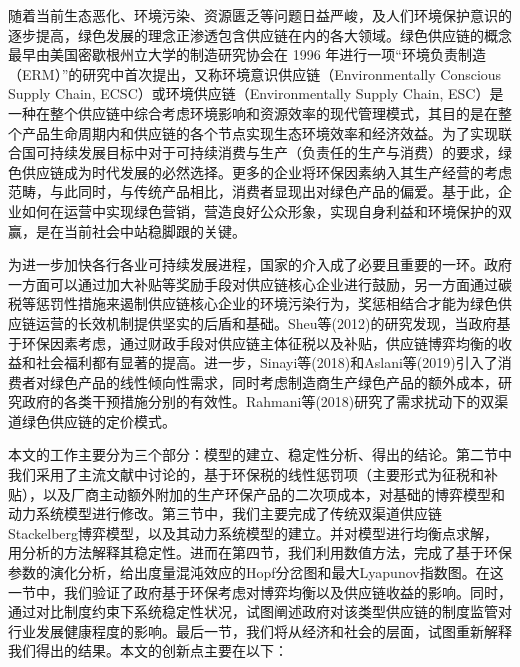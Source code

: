 \documentclass{article}
\begin{document}
\par 随着当前生态恶化、环境污染、资源匮乏等问题日益严峻，及人们环境保护意识的逐步提高，绿色发展的理念正渗透包含供应链在内的各大领域。绿色供应链的概念最早由美国密歇根州立大学的制造研究协会在 1996 年进行一项“环境负责制造（ERM）”的研究中首次提出，又称环境意识供应链（Environmentally Conscious Supply Chain, ECSC）或环境供应链（Environmentally Supply Chain, ESC）是一种在整个供应链中综合考虑环境影响和资源效率的现代管理模式，其目的是在整个产品生命周期内和供应链的各个节点实现生态环境效率和经济效益。为了实现联合国可持续发展目标中对于可持续消费与生产（负责任的生产与消费）的要求，绿色供应链成为时代发展的必然选择。更多的企业将环保因素纳入其生产经营的考虑范畴，与此同时，与传统产品相比，消费者显现出对绿色产品的偏爱\cite{2015Zhang2}。基于此，企业如何在运营中实现绿色营销，营造良好公众形象，实现自身利益和环境保护的双赢，是在当前社会中站稳脚跟的关键。
\par 为进一步加快各行各业可持续发展进程，国家的介入成了必要且重要的一环。政府一方面可以通过加大补贴等奖励手段对供应链核心企业进行鼓励，另一方面通过碳税等惩罚性措施来遏制供应链核心企业的环境污染行为，奖惩相结合才能为绿色供应链运营的长效机制提供坚实的后盾和基础\cite{2019Feng}。Sheu等(2012)\cite{2012Sheu}的研究发现，当政府基于环保因素考虑，通过财政手段对供应链主体征税以及补贴，供应链博弈均衡的收益和社会福利都有显著的提高。进一步，Sinayi等(2018)\cite{2018Sinayi}和Aslani等(2019)\cite{2019Aslani}引入了消费者对绿色产品的线性倾向性需求，同时考虑制造商生产绿色产品的额外成本，研究政府的各类干预措施分别的有效性。Rahmani等(2018)\cite{2018Rahami}研究了需求扰动下的双渠道绿色供应链的定价模式。
\par 本文的工作主要分为三个部分：模型的建立、稳定性分析、得出的结论。第二节中我们采用了主流文献中讨论的，基于环保税的线性惩罚项（主要形式为征税和补贴），以及厂商主动额外附加的生产环保产品的二次项成本，对基础的博弈模型和动力系统模型进行修改。第三节中，我们主要完成了传统双渠道供应链Stackelberg博弈模型，以及其动力系统模型的建立。并对模型进行均衡点求解，用分析的方法解释其稳定性。进而在第四节，我们利用数值方法，完成了基于环保参数的演化分析，给出度量混沌效应的Hopf分岔图和最大Lyapunov指数图。在这一节中，我们验证了政府基于环保考虑对博弈均衡以及供应链收益的影响。同时，通过对比制度约束下系统稳定性状况，试图阐述政府对该类型供应链的制度监管对行业发展健康程度的影响。最后一节，我们将从经济和社会的层面，试图重新解释我们得出的结果。本文的创新点主要在以下：%
\end{document}
